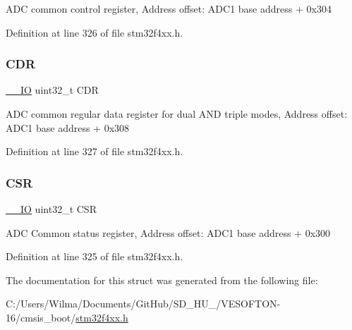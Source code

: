 A\+DC common control register, Address offset\+: A\+D\+C1 base address + 0x304 

Definition at line 326 of file stm32f4xx.\+h.

\mbox{\label{struct_a_d_c___common___type_def_a760f86a1a18dffffda54fc15a977979f}} 
\subsubsection{\texorpdfstring{C\+DR}{CDR}}
{\footnotesize\ttfamily \hyperlink{group___c_m_s_i_s__core__definitions_gaec43007d9998a0a0e01faede4133d6be}{\+\_\+\+\_\+\+IO} uint32\+\_\+t C\+DR}

A\+DC common regular data register for dual A\+ND triple modes, Address offset\+: A\+D\+C1 base address + 0x308 

Definition at line 327 of file stm32f4xx.\+h.

\mbox{\label{struct_a_d_c___common___type_def_a876dd0a8546697065f406b7543e27af2}} 
\subsubsection{\texorpdfstring{C\+SR}{CSR}}
{\footnotesize\ttfamily \hyperlink{group___c_m_s_i_s__core__definitions_gaec43007d9998a0a0e01faede4133d6be}{\+\_\+\+\_\+\+IO} uint32\+\_\+t C\+SR}

A\+DC Common status register, Address offset\+: A\+D\+C1 base address + 0x300 

Definition at line 325 of file stm32f4xx.\+h.



The documentation for this struct was generated from the following file\+:\begin{DoxyCompactItemize}
\item 
C\+:/\+Users/\+Wilma/\+Documents/\+Git\+Hub/\+S\+D\+\_\+\+H\+U\+\_/\+V\+E\+S\+O\+F\+T\+O\+N-\/16/cmsis\+\_\+boot/\hyperlink{stm32f4xx_8h}{stm32f4xx.\+h}\end{DoxyCompactItemize}
